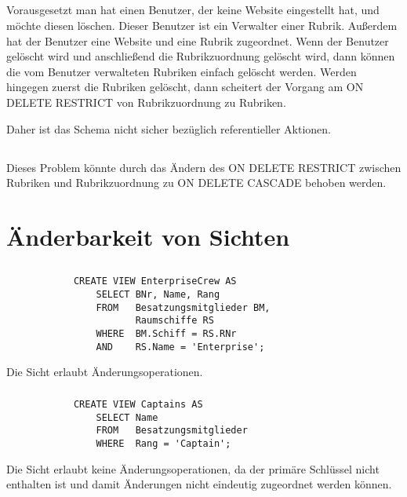 \documentclass[ngerman]{gdb-aufgabenblatt}
\begin{document}
	\subsection{} %
		Vorausgesetzt man hat einen Benutzer, der keine Website eingestellt hat, und möchte diesen löschen. Dieser Benutzer ist ein Verwalter einer Rubrik. Außerdem hat der Benutzer eine Website und eine Rubrik zugeordnet. Wenn der Benutzer gelöscht wird und anschließend die Rubrikzuordnung gelöscht wird, dann können die vom Benutzer verwalteten Rubriken einfach gelöscht werden. Werden hingegen zuerst die Rubriken gelöscht, dann scheitert der Vorgang am ON DELETE RESTRICT von Rubrikzuordnung zu Rubriken.
		
		Daher ist das Schema nicht sicher bezüglich referentieller Aktionen.
	\subsection{} %
		Dieses Problem könnte durch das Ändern des ON DELETE RESTRICT zwischen Rubriken und Rubrikzuordnung zu ON DELETE CASCADE behoben werden.
\section{Änderbarkeit von Sichten}
	\subsection{} %
		\subsubsection{} %
			\begin{verbatim}
			CREATE VIEW EnterpriseCrew AS
			    SELECT BNr, Name, Rang
			    FROM   Besatzungsmitglieder BM,
			           Raumschiffe RS
			    WHERE  BM.Schiff = RS.RNr
			    AND    RS.Name = 'Enterprise';
			\end{verbatim}
			Die Sicht erlaubt Änderungsoperationen.
		\subsubsection{} %
			\begin{verbatim}
			CREATE VIEW Captains AS
			    SELECT Name
			    FROM   Besatzungsmitglieder
			    WHERE  Rang = 'Captain';
			\end{verbatim}
			Die Sicht erlaubt keine Änderungsoperationen, da der primäre Schlüssel nicht enthalten ist und damit Änderungen nicht eindeutig zugeordnet werden können.
\end{document}
